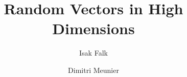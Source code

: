 \documentclass{beamer}
\title[]{Random Vectors in High Dimensions}
\author[]{Isak Falk \and Dimitri Meunier}
\begin{document}
\begin{frame}
  \titlepage%
\end{frame}
\end{document}
